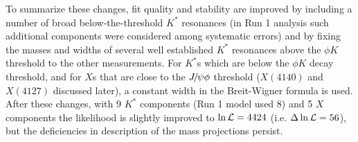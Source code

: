 To summarize these changes, 
fit quality and stability are improved by including a number of broad below-the-threshold $K^*$ resonances 
(in Run 1 analysis such additional components were considered among systematic errors) 
and by fixing the masses and widths of several well established $K^*$ resonances above the $\phi K$ threshold to the other measurements. 
For $K^*$s which are below the $\phi K$ decay threshold, 
and for $X$s that are close to the ${{J\mskip -3mu/\mskip -2mu\psi}}\phi$ threshold (\ie $X(4140)$ and $X(4127)$ discussed later), 
a constant width in the Breit-Wigner formula is used. 
After these changes, 
with 9 $K^*$ components (Run 1 model used 8) and 5 $X$ components the likelihood is slightly improved to $\ln\mathcal{L}=4424$ (i.e. $\Delta\ln\mathcal{L}=56$), 
but the deficiencies in description of the mass projections persist. 


